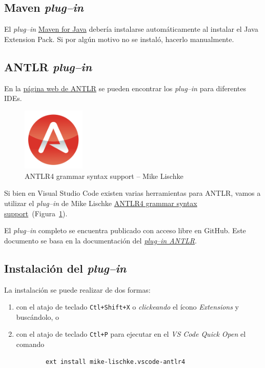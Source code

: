 \subsection{Maven \emph{plug--in}}
\label{pluginMaven}

El \emph{plug--in} \href{https://marketplace.visualstudio.com/items?itemName=vscjava.vscode-maven}{Maven for Java} debería instalarse automáticamente al instalar el Java Extension Pack.  Si por algún motivo no se instaló, hacerlo manualmente.


\subsection{ANTLR \emph{plug--in}}
\label{pluginANTLR}

En la \href{https://www.antlr.org/tools.html}{página web de ANTLR} se pueden encontrar los \emph{plug--in} para diferentes IDEs.

\begin{figure}[b]
	\centering
	\includegraphics[width=3cm]{img/IconoANTLRvscode}
	\caption{ANTLR4 grammar syntax support -- Mike Lischke}
	\label{icono}
\end{figure}

Si bien en Visual Studio Code existen varias herramientas para ANTLR, vamos a utilizar el \emph{plug--in} de Mike Lischke \href{https://marketplace.visualstudio.com/items?itemName=mike-lischke.vscode-antlr4}{ANTLR4 grammar syntax support}~(Figura~\ref{icono}).

El \emph{plug--in} completo se encuentra publicado con acceso libre en GitHub.  Este documento se basa en la documentación del \href{https://github.com/mike-lischke/vscode-antlr4/tree/master/doc}{\emph{plug--in ANTLR}}.


\subsection*{Instalación del \emph{plug--in}}
\label{instalacionANTLR}

La instalación se puede realizar de dos formas:
\begin{enumerate}
	\item con el atajo de teclado \verb|Ctl+Shift+X| o \emph{clickeando} el ícono \emph{Extensions} y buscándolo, o
    \item con el atajo de teclado \verb|Ctl+P| para ejecutar en el \emph{VS Code Quick Open} el comando
    \begin{verbatim}
		ext install mike-lischke.vscode-antlr4
	\end{verbatim}
\end{enumerate}

